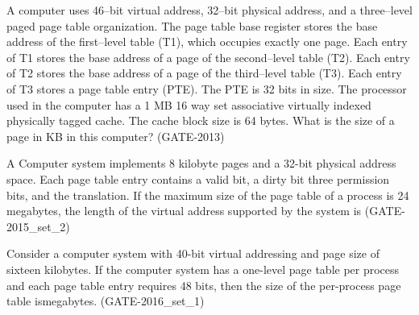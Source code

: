 
\begin{questyle}

  \question  A computer uses 46–bit virtual address, 32–bit physical address, and a three–level paged page table organization.
             The page table base register stores the base address of the first–level table (T1), which occupies
             exactly one page. Each entry of T1 stores the base address of a page of the second–level table (T2).
             Each entry of T2 stores the base address of a page of the third–level table (T3). Each entry of T3
             stores a page table entry (PTE). The PTE is 32 bits in size. The processor used in the computer has
             a 1 MB 16 way set associative virtually indexed physically tagged cache. The cache block size
             is 64 bytes. What is the size of a page in KB in this computer? (GATE-2013)

  \begin{choices}
  \end{choices}

\end{questyle}


\begin{questyle}

  \question   A Computer system implements 8 kilobyte pages and a 32-bit physical address space. Each page table
              entry contains a valid bit, a dirty bit three permission bits, and the translation. If the maximum size
              of the page table of a process is 24 megabytes, the length of the virtual address
              supported by the system is \fillin[36] (GATE-2015\_set\_2)
\end{questyle}


\begin{questyle}

  \question  Consider a computer system with 40-bit virtual addressing and page size of sixteen kilobytes.
              If the computer system has a one-level page table per process and each page table entry requires 48 bits,
              then the size of the per-process page table is\fillin[384] megabytes. (GATE-2016\_set\_1)

\end{questyle}

